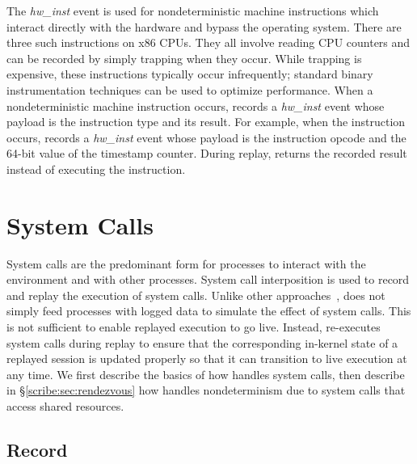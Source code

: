 The {\em hw\_inst} event is used for nondeterministic machine
instructions which interact directly with the hardware and bypass the
operating system.  There are three such instructions on x86 CPUs.
They all involve reading CPU counters and can be recorded by simply
trapping when they occur.  While trapping is expensive, these
instructions typically occur infrequently; standard binary
instrumentation techniques can be used to optimize performance. 
When a nondeterministic machine instruction occurs, \scribe{} records
a {\em hw\_inst} event whose payload is the instruction type and
its result.  For example, when the  instruction occurs,
\scribe{} records a {\em hw\_inst} event whose payload is the
 instruction opcode and the 64-bit value of the timestamp
counter.  During replay, \scribe{} returns the recorded result
instead of executing the instruction.

\section{System Calls}
\label{scribe:sec:syscalls}

System calls are the predominant form for processes to interact with
the environment and with other processes. System call interposition is
used to record and replay the execution of system calls.
Unlike other approaches~\cite{liblog,jockey,flashback}, \scribe{} does
not simply feed processes with logged data to simulate the effect of
system calls.  This is not sufficient to enable replayed execution to
go live.  Instead, \scribe{} re-executes system calls during replay to
ensure that the corresponding in-kernel state of a replayed session is
updated properly so that it can transition to live execution at any
time.  We first describe the basics of how \scribe{} handles system
calls, then describe in \S\ref{scribe:sec:rendezvous} how \scribe{}
handles nondeterminism due to system calls that access shared
resources. 

  

\subsection{Record}

